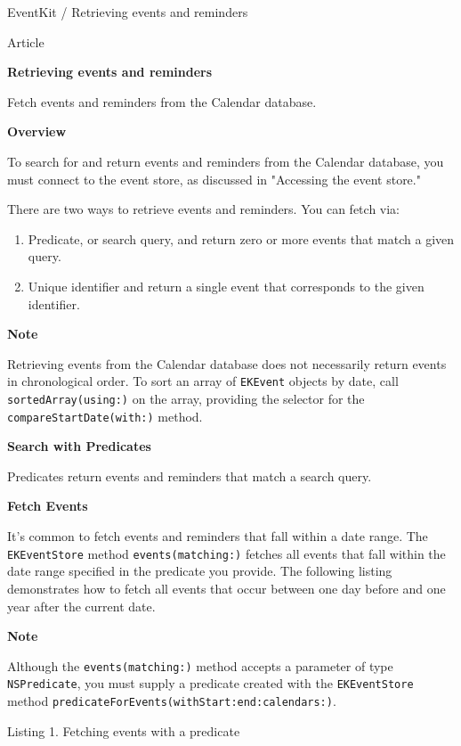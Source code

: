 \documentclass{article}
\title{}
\author{}
\date{}
\begin{document}
EventKit / Retrieving events and reminders

Article

\textbf{Retrieving events and reminders}

Fetch events and reminders from the Calendar database.

\textbf{Overview}

To search for and return events and reminders from the Calendar database, you must connect to the event store, as discussed in "Accessing the event store."

There are two ways to retrieve events and reminders. You can fetch via:

\begin{enumerate}
    \item Predicate, or search query, and return zero or more events that match a given query.
    \item Unique identifier and return a single event that corresponds to the given identifier.
\end{enumerate}

\textbf{Note}

Retrieving events from the Calendar database does not necessarily return events in chronological order. To sort an array of \texttt{EKEvent} objects by date, call \texttt{sortedArray(using:)} on the array, providing the selector for the \texttt{compareStartDate(with:)} method.

\textbf{Search with Predicates}

Predicates return events and reminders that match a search query.

\textbf{Fetch Events}

It's common to fetch events and reminders that fall within a date range. The \texttt{EKEventStore} method \texttt{events(matching:)} fetches all events that fall within the date range specified in the predicate you provide. The following listing demonstrates how to fetch all events that occur between one day before and one year after the current date.

\textbf{Note}

Although the \texttt{events(matching:)} method accepts a parameter of type \texttt{NSPredicate}, you must supply a predicate created with the \texttt{EKEventStore} method \texttt{predicateForEvents(withStart:end:calendars:)}.

Listing 1. Fetching events with a predicate
\end{document}
